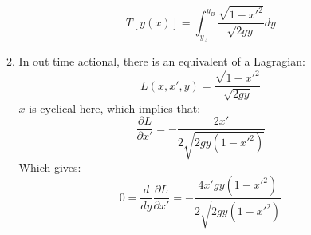 \documentclass[12pt,a4]{article}
\begin{document}
\begin{enumerate}
\begin{enumerate}
        \begin{equation*}
          T[y(x)] = \int_{y_A}^{y_B} \frac{\sqrt{1 - x'^2}}{\sqrt{2gy}} dy
        \end{equation*}
      \item
        In out time actional, there is an equivalent of a Lagragian:
        \begin{equation*}
          L(x, x', y) = \frac{\sqrt{1 - x'^2}}{\sqrt{2gy}}
        \end{equation*}
        $x$ is cyclical here, which implies that:
        \begin{equation*}
          \frac{\partial L}{\partial x'} = - \frac{2 x'}{2\sqrt{2gy(1 - x'^2)}}
        \end{equation*}
        Which gives:
        \begin{equation*}
          0 = \frac{d}{dy}\frac{\partial L}{\partial x'} = - \frac{4 x'gy(1 - x'^2)}{2\sqrt{2gy(1 - x'^2)}}
        \end{equation*}
        

\end{enumerate}
\end{enumerate}
\end{document}
